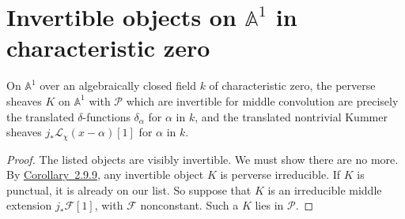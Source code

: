 \section[Invertible objects on the affine line]{Invertible objects on
\texorpdfstring{\(\mathbb{A}^1\)}{A1} in characteristic zero}\label{sec:2.11}

On \(\mathbb{A}^1\) over an algebraically closed field \(k\) of characteristic
zero, the perverse sheaves \(K\) on \(\mathbb{A}^1\) with \(\mathcal{P}\) which
are invertible for middle convolution are precisely the translated
\(\delta\)-functions \(\delta_\alpha\) for \(\alpha\) in \(k\), and the
translated nontrivial Kummer sheaves \(j_*\mathcal{L}_\chi(x-\alpha)[1]\) for
\(\alpha\) in \(k\).

\begin{proof}
The listed objects are visibly invertible. We must show there are no more. By
\hyperref[cor:2.9.9]{Corollary~2.9.9}, any invertible object \(K\) is perverse
irreducible. If \(K\) is punctual, it is already on our list. So suppose that
\(K\) is an irreducible middle extension \(j_*\mathcal{F}[1]\), with
\(\mathcal{F}\) nonconstant. Such a \(K\) lies in \(\mathcal{P}\).


\end{proof}
